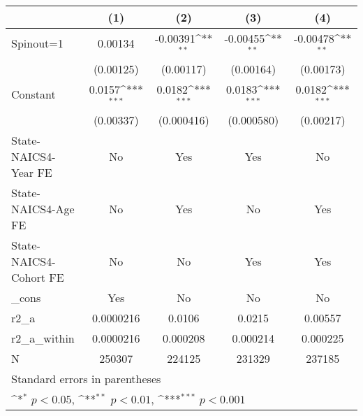 {
\def\sym#1{\ifmmode^{#1}\else\(^{#1}\)\fi}
\begin{tabular}{l*{4}{c}}
\hline\hline
                    &\multicolumn{1}{c}{(1)}         &\multicolumn{1}{c}{(2)}         &\multicolumn{1}{c}{(3)}         &\multicolumn{1}{c}{(4)}         \\
\hline
Spinout=1           &     0.00134         &    -0.00391\sym{**} &    -0.00455\sym{**} &    -0.00478\sym{**} \\
                    &   (0.00125)         &   (0.00117)         &   (0.00164)         &   (0.00173)         \\
[1em]
Constant            &      0.0157\sym{***}&      0.0182\sym{***}&      0.0183\sym{***}&      0.0182\sym{***}\\
                    &   (0.00337)         &  (0.000416)         &  (0.000580)         &   (0.00217)         \\
[1em]
State-NAICS4-Year FE&          No         &         Yes         &         Yes         &          No         \\
[1em]
State-NAICS4-Age FE &          No         &         Yes         &          No         &         Yes         \\
[1em]
State-NAICS4-Cohort FE&          No         &          No         &         Yes         &         Yes         \\
[1em]
\_cons              &         Yes         &          No         &          No         &          No         \\
\hline
r2\_a                &   0.0000216         &      0.0106         &      0.0215         &     0.00557         \\
r2\_a\_within         &   0.0000216         &    0.000208         &    0.000214         &    0.000225         \\
N                   &      250307         &      224125         &      231329         &      237185         \\
\hline\hline
\multicolumn{5}{l}{\footnotesize Standard errors in parentheses}\\
\multicolumn{5}{l}{\footnotesize \sym{*} \(p<0.05\), \sym{**} \(p<0.01\), \sym{***} \(p<0.001\)}\\
\end{tabular}
}
